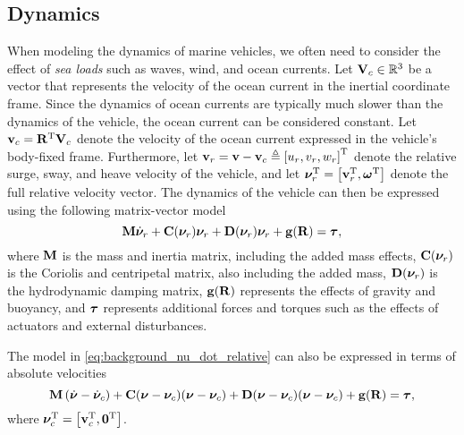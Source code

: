 \subsection{Dynamics}
When modeling the dynamics of marine vehicles, we often need to consider the effect of \emph{sea loads} such as waves, wind, and ocean currents.
Let $\mathbf{V}_c \in \mathbb{R}^3$ be a vector that represents the velocity of the ocean current in the inertial coordinate frame.
Since the dynamics of ocean currents are typically much slower than the dynamics of the vehicle, the ocean current can be considered constant.
Let $\mathbf{v}_c = \mathbf{R}^{\mathrm{T}} \mathbf{V}_c$ denote the velocity of the ocean current expressed in the vehicle's body-fixed frame.
Furthermore, let $\mathbf{v}_r = \mathbf{v} - \mathbf{v}_c \triangleq \left[u_r, v_r, w_r\right]^{\mathrm{T}}$ denote the relative surge, sway, and heave velocity of the vehicle, and let $\bm{\nu}_r^{\mathrm{T}} = \left[\mathbf{v}_r^{\mathrm{T}}, \bm{\omega}^{\mathrm{T}}\right]$ denote the full relative velocity vector.
The dynamics of the vehicle can then be expressed using the following matrix-vector model \cite{fossen_handbook_2011}
\begin{equation}
    \mathbf{M} \dot{\bm{\nu}}_r + \mathbf{C}(\bm{\nu}_r)\bm{\nu}_r + \mathbf{D}(\bm{\nu}_r)\bm{\nu}_r + \mathbf{g}(\mathbf{R}) = \bm{\tau},
    \label{eq:background_nu_dot_relative}
\end{equation}
where $\mathbf{M}$ is the mass and inertia matrix, including the added mass effects, $\mathbf{C}(\bm{\nu}_r)$ is the Coriolis and centripetal matrix, also including the added mass, $\mathbf{D}(\bm{\nu}_r)$ is the hydrodynamic damping matrix, $\mathbf{g}(\mathbf{R})$ represents the effects of gravity and buoyancy, and $\bm{\tau}$ represents additional forces and torques such as the effects of actuators and external disturbances.

The model in \eqref{eq:background_nu_dot_relative} can also be expressed in terms of absolute velocities
\begin{equation}
    \mathbf{M} \left(\dot{\bm{\nu}} - \dot{\bm{\nu}}_c\right) + \mathbf{C}(\bm{\nu} - \bm{\nu}_c)(\bm{\nu} - \bm{\nu}_c) + \mathbf{D}(\bm{\nu} - \bm{\nu}_c)(\bm{\nu} - \bm{\nu}_c) + \mathbf{g}(\mathbf{R}) = \bm{\tau},
\end{equation}
where $\bm{\nu}_c^{\mathrm{T}} = \left[\mathbf{v}_c^{\mathrm{T}}, \mathbf{0}^{\mathrm{T}}\right]$.

